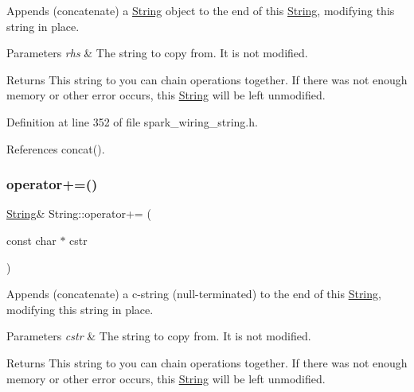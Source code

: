 Appends (concatenate) a \hyperlink{class_string}{String} object to the end of this \hyperlink{class_string}{String}, modifying this string in place. 


\begin{DoxyParams}{Parameters}
{\em rhs} & The string to copy from. It is not modified.\\
\hline
\end{DoxyParams}
\begin{DoxyReturn}{Returns}
This string to you can chain operations together. If there was not enough memory or other error occurs, this \hyperlink{class_string}{String} will be left unmodified. 
\end{DoxyReturn}


Definition at line 352 of file spark\+\_\+wiring\+\_\+string.\+h.



References concat().

\mbox{\label{class_string_ab41e81fc0c337cab456509994d12f097}} 
\subsubsection{\texorpdfstring{operator+=()}{operator+=()}\hspace{0.1cm}{\footnotesize\ttfamily [2/8]}}
{\footnotesize\ttfamily \hyperlink{class_string}{String}\& String\+::operator+= (\begin{DoxyParamCaption}\item[{const char $\ast$}]{cstr }\end{DoxyParamCaption})\hspace{0.3cm}{\ttfamily [inline]}}



Appends (concatenate) a c-\/string (null-\/terminated) to the end of this \hyperlink{class_string}{String}, modifying this string in place. 


\begin{DoxyParams}{Parameters}
{\em cstr} & The string to copy from. It is not modified.\\
\hline
\end{DoxyParams}
\begin{DoxyReturn}{Returns}
This string to you can chain operations together. If there was not enough memory or other error occurs, this \hyperlink{class_string}{String} will be left unmodified. 
\end{DoxyReturn}


